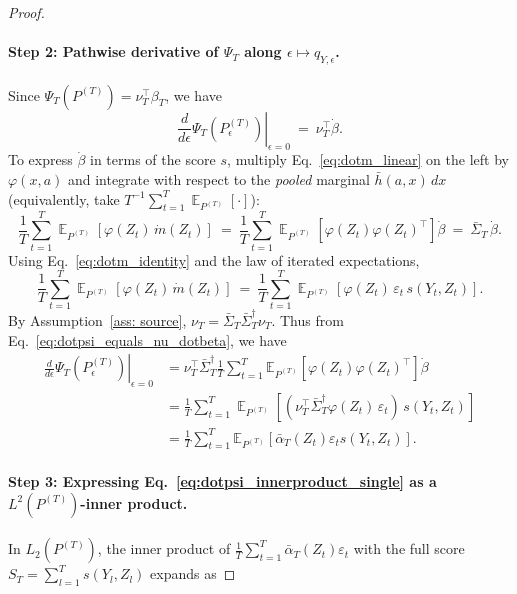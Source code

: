 \documentclass[11pt]{article}
\DeclareMathOperator{\E}{\mathbb{E}}
\begin{document}
\begin{proof}
\paragraph{Step 2: Pathwise derivative of $\Psi_T$ along $\epsilon\mapsto q_{Y,\epsilon}$.}
Since $\Psi_T(P^{(T)})=\nu_T^{\top} \beta_T$, we have
\begin{equation}
\label{eq:dotpsi_equals_nu_dotbeta}
\left.\frac{d}{d\epsilon}\Psi_T(P^{(T)}_\epsilon)\right|_{\epsilon=0}
\ =\ \nu_T^{\top} \dot\beta.
\end{equation}
To express $\dot\beta$ in terms of the score $s$, multiply Eq.~\eqref{eq:dotm_linear} on the left by $\varphi(x,a)$ and integrate
with respect to the \emph{pooled} marginal $\bar h(a,x)\,dx$ (equivalently, take $T^{-1}\sum_{t=1}^T\E_{P^{(T)}}[\cdot]$):
\[
\frac{1}{T}\sum_{t=1}^T \E_{P^{(T)}}\!\left[\varphi(Z_t)\,\dot m(Z_t)\right]
\ =\
\frac{1}{T}\sum_{t=1}^T \E_{P^{(T)}}\!\left[\varphi(Z_t)\varphi(Z_t)^\top\right]\dot\beta
\ =\ \bar{\Sigma}_T\,\dot\beta.
\]Using Eq.~\eqref{eq:dotm_identity} and the law of iterated expectations,
\[
\frac{1}{T}\sum_{t=1}^T \E_{P^{(T)}}\!\left[\varphi(Z_t)\,\dot m(Z_t)\right]
\ =\
\frac{1}{T}\sum_{t=1}^T \E_{P^{(T)}}\!\left[\varphi(Z_t)\,\varepsilon_t\,s(Y_t,Z_t)\right].
\]
By Assumption~\ref{ass: source}, $\nu_T = \bar{\Sigma}_T\bar{\Sigma}_T^{\dag}\nu_T$. Thus from Eq.~\eqref{eq:dotpsi_equals_nu_dotbeta}, we have
\begin{align}
    \left.\frac{d}{d\epsilon}\Psi_T(P^{(T)}_\epsilon)\right|_{\epsilon=0}
    &= \nu_T^{\top}\bar{\Sigma}_T^{\dag}\frac{1}{T}\sum_{t=1}^{T}\mathbb{E}_{P^{(T)}}\left[\varphi(Z_t)\varphi(Z_t)^{\top}\right]\dot{\beta}\nonumber\\
&= \frac{1}{T}\sum_{t=1}^T
\E_{P^{(T)}}\!\left[\left(\nu_T^{\top} \bar{\Sigma}_T^{\dag}\varphi(Z_t)\,\varepsilon_t\right)\,s(Y_t,Z_t)\right]\nonumber\\
&= \frac{1}{T}\sum_{t=1}^{T}\mathbb{E}_{P^{(T)}}\left[\bar{\alpha}_T(Z_t)\varepsilon_t s(Y_t, Z_t)\right].\label{eq:dotpsi_innerproduct_single}
\end{align}

\paragraph{Step 3: Expressing Eq.~\eqref{eq:dotpsi_innerproduct_single} as a $L^2(P^{(T)})$-inner product. }
In $L_2(P^{(T)})$, the inner product of $\frac{1}{T}\sum_{t=1}^T \bar\alpha_T(Z_t)\varepsilon_t$ with the full score $S_T=\sum_{l=1}^T s(Y_l,Z_l)$ expands as


\end{proof}
\end{document}
